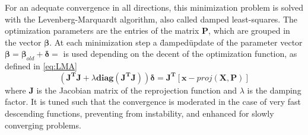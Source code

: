 For an adequate convergence in all directions, this minimization problem is solved with the Levenberg-Marquardt algorithm, also called damped least-squares. The optimization parameters are the entries of the matrix $\mathbf{P}$, which are grouped in the vector $\boldsymbol\beta$. At each minimization step a \"damped\" update of the parameter vector $\boldsymbol\beta=\boldsymbol\beta_{old}+\boldsymbol\delta=$ is used depending on the decent of the optimization function, as defined in \eqref{eq:LMA} \cite{LMA}
\begin{equation}
    (\mathbf{J^T}\mathbf{J} + \lambda \mathbf{diag}(\mathbf{J^T}\mathbf{J}))\boldsymbol\delta = \mathbf{J^T}[\mathbf{x}-proj(\mathbf{X},\mathbf{P})]
\label{eq:LMA}
\end{equation}
where $\mathbf{J}$ is the Jacobian matrix of the reprojection function and $\lambda$ is the damping factor. It is tuned such that
the convergence is moderated in the case of very fast descending functions, preventing from instability, and enhanced for slowly converging problems.
